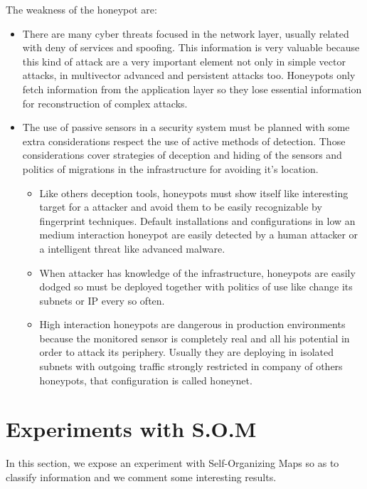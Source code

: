 \documentclass[a4paper]{llncs}
\begin{document}
The weakness of the honeypot are:
\begin{itemize}
	\item There are many cyber threats focused in the network layer, usually related with deny of services and spoofing. This information is very valuable because this kind of attack are a very important element not only in simple vector attacks, in multivector advanced and persistent attacks too. Honeypots only fetch information from the application layer so they lose essential information for reconstruction of complex attacks.
	\item The use of passive sensors in a security system must be planned with some extra considerations respect the use of active methods of detection. Those considerations cover strategies of deception and hiding of the sensors and politics of migrations in the infrastructure for avoiding it's location.
	\begin{itemize}
		\item Like others deception tools, honeypots must show itself like interesting target for a attacker and avoid them to be easily recognizable by fingerprint techniques. Default installations and configurations in low an medium interaction honeypot are easily detected by a human attacker or a intelligent threat like advanced malware.
		\item When attacker has knowledge of the infrastructure, honeypots are easily dodged so must be deployed together with politics of use like change its subnets or IP every so often.
		\item High interaction honeypots are dangerous in production environments because the monitored sensor is completely real and all his potential in order to attack its periphery. Usually they are deploying in isolated subnets with outgoing traffic strongly restricted in company of others honeypots, that configuration is called honeynet.
	\end{itemize}
\end{itemize}
	
\section{Experiments with S.O.M}
\label{sec:Improve}
In this section, we expose an experiment with Self-Organizing Maps so as to classify information and we comment some interesting results.
\end{document}
